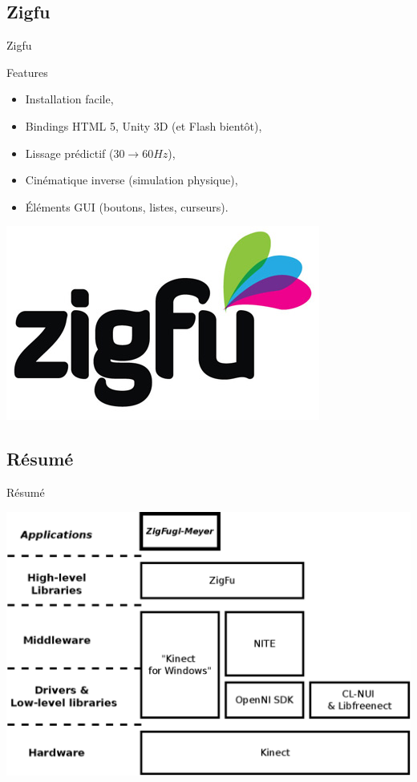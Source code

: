 \subsection{Zigfu}
\begin{frame}{Zigfu}
\begin{block}{Features~\cite{zigfu_video}}
  \begin{itemize}
  \item Installation facile, 
  \item Bindings HTML 5, Unity 3D (et Flash bientôt),
  \item Lissage prédictif ($30 \rightarrow 60Hz$), 
  \item Cinématique inverse (simulation physique),
  \item Éléments GUI (boutons, listes, curseurs).
  \end{itemize}
\end{block}
\begin{center}
\includegraphics[width=0.2\linewidth]{../images/zigfu_logo}
\end{center}
\end{frame}

\subsection{Résumé}
\begin{frame}{Résumé}
\begin{center}
\includegraphics[width=0.9\linewidth]{../images/technology_overview_4}
\end{center}
\end{frame}